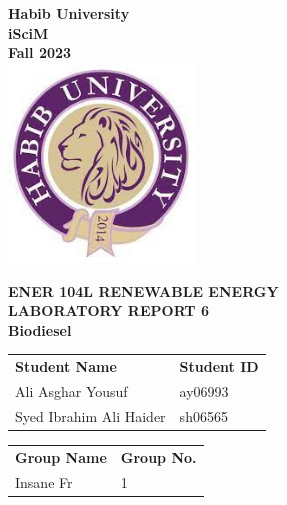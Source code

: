 \documentclass[a4paper, 12pt, english]{article}
\begin{document}
\begin{titlepage}
	\begin{center}
		\textbf{\LARGE Habib University}\\[0.5cm]
		\textbf{\large iSciM}\\[0.2cm]
		\textbf {\large Fall 2023}\\[0.2cm]
		\vspace{20pt}
		\includegraphics[width=5cm]{../habiblogo.jpg}\\[1cm]
		\par
		\vspace{20pt}
		\textbf{\Large ENER 104L RENEWABLE ENERGY}\\
		\vspace{15pt}
		\myrule[1pt][7pt]
		\textbf{\LARGE  LABORATORY REPORT 6}\\
		\vspace{15pt}
		\textbf{\large Biodiesel}\\
		\myrule[1pt][7pt]
		\vspace{25pt}
		\begin{tabular}{@{}p{5cm}p{3cm}@{}}
			\textbf{\large Student Name} & \textbf{\large Student ID} \\
			Ali Asghar Yousuf            & ay06993                    \\ %
			Syed Ibrahim Ali Haider      & sh06565                    \\ %
		\end{tabular}

		\vspace{10pt}
		\begin{tabular}{@{}p{5cm}p{3cm}@{}}
			\textbf{\large Group Name} & \textbf{\large Group No.} \\
			Insane Fr                  & 1                         \\
		\end{tabular}


\end{center}
\end{titlepage}
\end{document}
